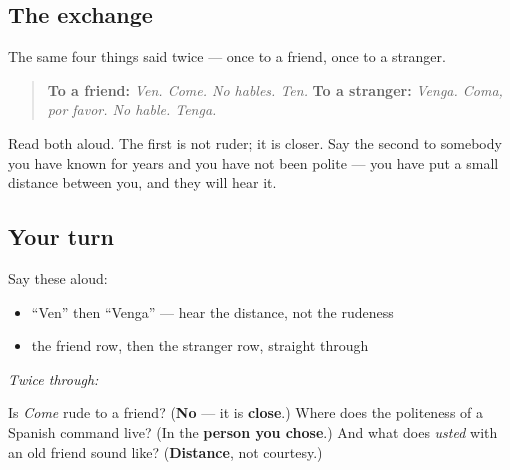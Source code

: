 \subsection*{The exchange}
The same four things said twice — once to a friend, once to a stranger.

\begin{quote}
\textbf{To a friend:} \emph{Ven. Come. No hables. Ten.} \textbf{To a stranger:} \emph{Venga. Coma, por favor. No hable. Tenga.}
\end{quote}

Read both aloud. The first is not ruder; it is closer. Say the second to somebody you have known for years and you have not been polite — you have put a small distance between you, and they will hear it.

\subsection*{Your turn}
Say these aloud:

\begin{itemize}
\raggedright
  \item \textquotedblleft{}Ven\textquotedblright{} then \textquotedblleft{}Venga\textquotedblright{} — hear the distance, not the rudeness
  \item the friend row, then the stranger row, straight through
\end{itemize}

\emph{Twice through:}

\begin{tcolorbox}[breakable,colback=teal!4,colframe=teal!35!black,title={Before you move on}]
Is \emph{Come} rude to a friend? (\textbf{No} — it is \textbf{close}.) Where does the politeness of a Spanish command live? (In the \textbf{person you chose}.) And what does \emph{usted} with an old friend sound like? (\textbf{Distance}, not courtesy.)
\end{tcolorbox}
